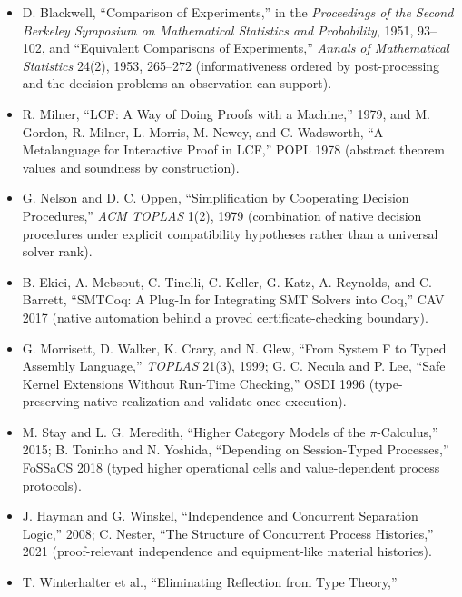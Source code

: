 \documentclass[11pt]{article}
\begin{document}
\begin{itemize}
  Model for Static Analysis of Programs by Construction or Approximation of
  Fixpoints,'' POPL 1977, and ``Abstract Interpretation Frameworks,''
  \emph{Journal of Logic and Computation} 2(4), 1992; P. Cousot, R. Cousot,
  and L. Mauborgne, ``The Reduced Product of Abstract Domains and the
  Combination of Decision Procedures,'' FoSSaCS 2011
  (sound precision orders, best abstractions, and reduced combinations).
\item D. Blackwell, ``Comparison of Experiments,'' in the \emph{Proceedings of
  the Second Berkeley Symposium on Mathematical Statistics and Probability},
  1951, 93--102, and ``Equivalent Comparisons of Experiments,'' \emph{Annals of
  Mathematical Statistics} 24(2), 1953, 265--272
  (informativeness ordered by post-processing and the decision problems an
  observation can support).
\item R. Milner, ``LCF: A Way of Doing Proofs with a Machine,'' 1979, and
  M. Gordon, R. Milner, L. Morris, M. Newey, and C. Wadsworth, ``A
  Metalanguage for Interactive Proof in LCF,'' POPL 1978
  (abstract theorem values and soundness by construction).
\item G. Nelson and D. C. Oppen, ``Simplification by Cooperating Decision
  Procedures,'' \emph{ACM TOPLAS} 1(2), 1979
  (combination of native decision procedures under explicit compatibility
  hypotheses rather than a universal solver rank).
\item B. Ekici, A. Mebsout, C. Tinelli, C. Keller, G. Katz, A. Reynolds, and
  C. Barrett, ``SMTCoq: A Plug-In for Integrating SMT Solvers into Coq,'' CAV
  2017 (native automation behind a proved certificate-checking boundary).
\item G. Morrisett, D. Walker, K. Crary, and N. Glew, ``From System F to Typed
  Assembly Language,'' \emph{TOPLAS} 21(3), 1999; G. C. Necula and P. Lee,
  ``Safe Kernel Extensions Without Run-Time Checking,'' OSDI 1996
  (type-preserving native realization and validate-once execution).
\item M. Stay and L. G. Meredith, ``Higher Category Models of the
  $\pi$-Calculus,'' 2015; B. Toninho and N. Yoshida, ``Depending on
  Session-Typed Processes,'' FoSSaCS 2018
  (typed higher operational cells and value-dependent process protocols).
\item J. Hayman and G. Winskel, ``Independence and Concurrent Separation
  Logic,'' 2008; C. Nester, ``The Structure of Concurrent Process Histories,''
  2021 (proof-relevant independence and equipment-like material histories).
\item T. Winterhalter et al., ``Eliminating Reflection from Type Theory,''

\end{itemize}
\end{document}
